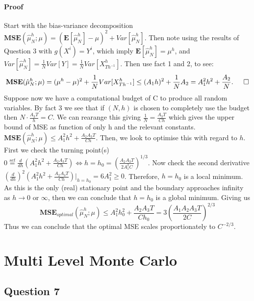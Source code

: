 \documentclass{article}
\begin{document}
\paragraph{Proof} Start with the bias-variance decomposition $\textbf{MSE}(\hat{\mu}_N^h ; \mu) = (\textbf{E}[\hat{\mu}_N^h]-\mu)^2 + Var[\hat{\mu}_N^h]$. Then note using the results of Question 3 with $g(X^i)=Y^i$, which imply $\textbf{E}[\hat{\mu}_N^h]=\mu^h$, and $Var[\hat{\mu}_N^h]= \frac{1}{N} Var[Y]=\frac{1}{N} Var[X_{Th^{-1}}^h].$ Then use fact 1 and 2, to see:
\begin{equation*}
\textbf{MSE}(\hat{\mu}_N^h ; \mu) = (\mu^h - \mu)^2 + \frac{1}{N}Var[X_{Th^{-1}}^h] \leq (A_1 h)^2 + \frac{1}{N}A_2 = A_1^2h^2  + \frac{A_2}{N}. \indent{} \Box
\end{equation*}
Suppose now we have a computational budget of C to produce all random variables. By fact 3 we see that if $(N,h)$ is chosen to completely use the budget then $N \cdot \frac{A_3 T}{h} = C$. We can rearange this giving $\frac{1}{N}=\frac{A_3 T}{Ch}$ which gives the upper bound of MSE as function of only h and the relevant constants. $\textbf{MSE}(\hat{\mu}_N^h;\mu) \leq A_1^2h^2 + \frac{A_2A_3T}{Ch}$. Then, we look to optimise this with regard to $h$. First we check the turning point(s) $0 \overset{set}{=} \frac{d}{dh}(A_1^2h^2 + \frac{A_2A_3T}{Ch}) \iff h=h_0=(\frac{A_2A_3T}{2A_1^2C})^{1/3}$. Now check the second derivative $(\frac{d}{dh})^2(A_1^2h^2+\frac{A_2A_3T}{Ch})|_{h=h_0}=6A_1^2 \geq 0$. Therefore, $h=h_0$ is a local minimum. As this is the only (real) stationary point and the boundary approaches infinity as $h \to 0 \text{ or } \infty$, then we can conclude that $h=h_0 $ is a global minimum. Giving us
\begin{equation}
\textbf{MSE}_{optimal}(\hat{\mu}_N^h;\mu) \leq A_1^2h_0^2+\frac{A_2A_3T}{Ch_0} = 3\left( \frac{A_1A_2A_3T}{2C} \right) ^{2/3}
\end{equation}
Thus we can conclude that the optimal MSE scales proportionately to $C^{-2/3}$.

\section{Multi Level Monte Carlo}

\subsection{Question 7}
\end{document}
